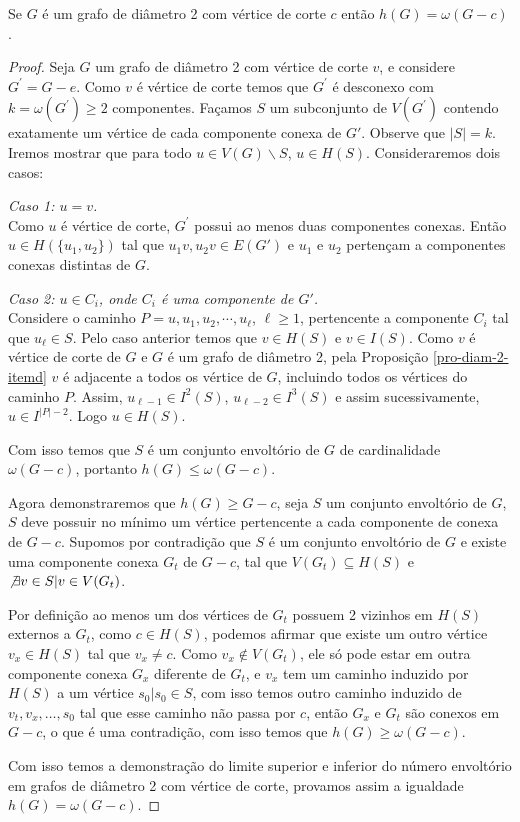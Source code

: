 \begin{proposition}
Se $G$ é um grafo de diâmetro 2 com vértice de corte $c$ então $h(G) = \omega(G-c)$. 
\end{proposition}
\begin{proof}
Seja $G$ um grafo de diâmetro 2 com vértice de corte $v$, e considere $G^\prime=G-e$. Como $v$ é vértice de corte temos que $G^\prime$ é desconexo com $k=\omega(G^\prime)\geq 2$ componentes. Façamos $S$ um subconjunto de $V(G^\prime)$ contendo exatamente um vértice de cada componente conexa de $G'$. Observe que $|S|=k$. Iremos mostrar que para todo $u \in V(G)\backslash S$, $u \in H(S)$. Consideraremos dois casos:

{\it Caso 1: $u=v$.}\\
Como $u$ é vértice de corte, $G^\prime$ possui ao menos duas componentes conexas. Então $u \in H(\{u_1, u_2\})$  tal que $u_1v, u_2v \in E(G')$ e $u_1$ e $u_2$ pertençam a componentes conexas distintas de $G$.

{\it Caso 2: $u \in C_i$, onde $C_i$ é uma componente de $G'$.}\\ 
Considere o caminho $P=u,u_1, u_2,\cdots, u_\ell$, $\ell \geq 1$, pertencente a componente $C_i$ tal que $u_\ell \in S$. Pelo caso anterior temos que $v \in H(S)$ e $v \in I(S)$. Como $v$ é vértice de corte de $G$ e $G$ é um grafo de diâmetro 2, pela Proposição \ref{pro-diam-2-itemd} $v$ é adjacente a todos os vértice de $G$, incluindo todos os vértices do caminho $P$. Assim, $u_{\ell-1} \in I^2(S)$, $u_{\ell-2} \in I^3(S)$ e assim sucessivamente, $u \in I^{|P|-2}$. Logo $u \in H(S)$.

Com isso temos que $S$ é um conjunto envoltório de $G$ de cardinalidade $\omega(G-c)$, portanto $h(G) \leq \omega(G-c)$.

Agora demonstraremos que $h(G)\ge G-c$, seja $S$ um conjunto envoltório de $G$, $S$ deve possuir no mínimo um vértice pertencente a cada componente de conexa de $G-c$. Supomos por contradição que $S$ é um conjunto envoltório de $G$ e existe uma componente conexa $G_t$ de $G-c$, tal que $V(G_t) \subseteq H(S)$ e $\not \exists v \in S|v\in V(G_t)$.

Por definição ao menos um dos vértices de $G_t$ possuem 2 vizinhos em $H(S)$ externos a $G_t$, como $c\in H(S)$, podemos afirmar que existe um outro vértice $v_x \in H(S)$ tal que $v_x \ne c$. Como $v_x \not \in V(G_t)$, ele só pode estar em outra componente conexa $G_x$ diferente de $G_t$, e $v_x$ tem um caminho induzido por $H(S)$ a um vértice $s_0|s_0\in S$, com isso temos outro caminho induzido de $v_t,v_x,\dots,s_0$ tal que esse caminho não passa por $c$, então $G_x$ e $G_t$ são conexos em $G-c$, o que é uma contradição, com isso temos que $h(G)\ge \omega(G-c)$.

Com isso temos a demonstração do limite superior e inferior do número envoltório em grafos de diâmetro 2 com vértice de corte, provamos assim a igualdade $h(G) = \omega(G-c)$.
\end{proof}

